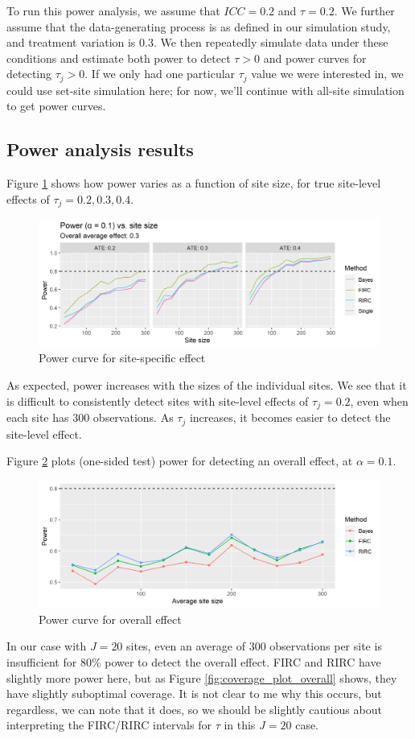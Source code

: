 \documentclass[]{article}
\begin{document}
To run this power analysis, we assume that $ICC=0.2$ and $\tau=0.2$.
We further assume that the data-generating process is as defined in our simulation study, and treatment variation is 0.3.
We then repeatedly simulate data under these conditions and estimate both power to detect $\tau > 0$ and power curves for detecting $\tau_j > 0$.
If we only had one particular $\tau_j$ value we were interested in, we could use set-site simulation here; for now, we'll continue with all-site simulation to get power curves.

\subsection{Power analysis results}

Figure \ref{fig:power_plot_ex} shows how power varies as a function of site size, for true site-level effects of $\tau_j = 0.2, 0.3, 0.4$.
\begin{figure}[ht]
	\centering
	\includegraphics[width=\textwidth]{power_plot_ex}
	\caption{Power curve for site-specific effect}
	\label{fig:power_plot_ex}
\end{figure}
As expected, power increases with the sizes of the individual sites.
We see that it is difficult to consistently detect sites with site-level effects of $\tau_j = 0.2$, even when each site has 300 observations.
As $\tau_j$ increases, it becomes easier to detect the site-level effect.

Figure \ref{fig:power_plot_overall} plots (one-sided test) power for detecting an overall effect, at $\alpha = 0.1$.
\begin{figure}[ht]
	\centering
	\includegraphics[width=\textwidth]{power_plot_overall_tau02}
	\caption{Power curve for overall effect}
	\label{fig:power_plot_overall}
\end{figure}
In our case with $J=20$ sites, even an average of 300 observations per site is insufficient for 80\% power to detect the overall effect.
FIRC and RIRC have slightly more power here, but as Figure \ref{fig:coverage_plot_overall} shows, they have slightly suboptimal coverage.
It is not clear to me why this occurs, but regardless, we can note that it does, so we should be slightly cautious about interpreting the FIRC/RIRC intervals for $\tau$ in this $J=20$ case.
\end{document}
